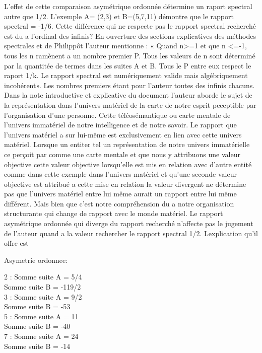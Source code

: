 \documentclass[a4paper,11pt]{article}
\begin{document}
L'effet de cette comparaison asymétrique ordonnée détermine un raport spectral autre que 1/2. L'exemple
A= (2,3) et B=(5,7,11) démontre que le rapport spectral = -1/6. 
Cette différence qui ne respecte pas le rapport spectral recherché est du a l'ordinal des infinis? En ouverture des 
sections explicatives des méthodes spectrales et de Philippôt l'auteur mentionne : « Quand n>=1 et que n <=-1, tous les
n ramènent a un nombre premier P. Tous les valeurs de n sont déterminé par la quantitée de termes dans les suites A et B. 
Tous le P entre eux respect le raport 1/k. Le rapport spectral est numériquement valide mais algébriquement incohérent».
Les nombres premiers étant pour l'auteur toutes des infinis chacuns. Dans la note introductive et explicative du document l'auteur 
aborde le sujet de la représentation dans l'univers matériel de la carte de notre esprit peceptible par l'organisation d'une personne. 
Cette téléosémantique ou carte mentale de l'univers immatériel de notre intelligence et de notre savoir. Le rapport que l'univers matériel 
a sur lui-même est exclusivement en lien avec cette univers matériel. Lorsque un entiter tel un représentation de notre univers immatérielle 
ce perçoit par comme une carte mentale et que nous y attribuons une valeur objective cette valeur objective lorsqu'elle est mis en relation avec 
d'autre entité comme dans cette exemple dans l'univers matériel et qu'une seconde valeur objective est attribué a cette mise en relation la valeur divergent 
ne détermine pas que l'univers matériel entre lui même aurait un rapport entre lui même différent. Mais bien que c'est notre compréhension du a notre organisation structurante
qui change de rapport avec le monde matériel. Le rapport asymétrique ordonnée qui diverge du rapport recherché n'affecte pas le jugement de l'auteur quand a la valeur rechercher le rapport
spectral 1/2. Lexplication qu'il offre est 

Asymetrie ordonnee:

2 : Somme suite A = 5/4 \\
Somme suite B = -119/2 \\

3 : Somme suite A = 9/2 \\
Somme suite B = -53 \\

5 : Somme suite A = 11 \\
Somme suite B = -40 \\

7 : Somme suite A = 24 \\
Somme suite B = -14 \\
\end{document}
